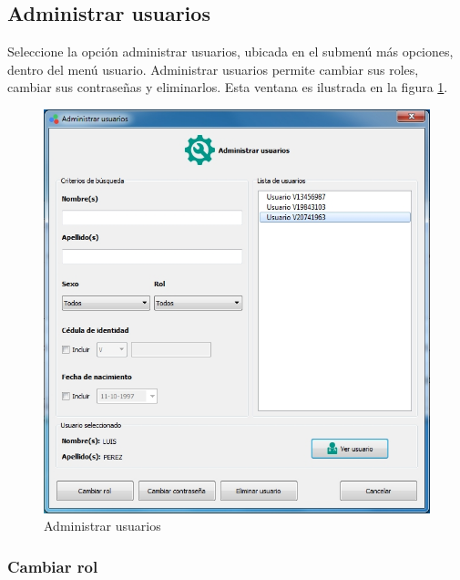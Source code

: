 	\subsection*{Administrar usuarios}
	
	Seleccione la opci\'{o}n administrar usuarios, ubicada en el submen\'{u} m\'{a}s opciones, dentro del men\'{u} usuario. Administrar usuarios permite cambiar sus roles, cambiar sus contrase\~{n}as y eliminarlos. Esta ventana es ilustrada en la figura \ref{fig:administrar-usuarios}.
\vfill
\begin{figure}[H]
  \centering
  \includegraphics[width=1\linewidth]{./img/administrar-usuarios.jpg}
\caption[]{Administrar usuarios\label{fig:administrar-usuarios}}
\end{figure}
\vfill
		\subsubsection*{Cambiar rol}
		
